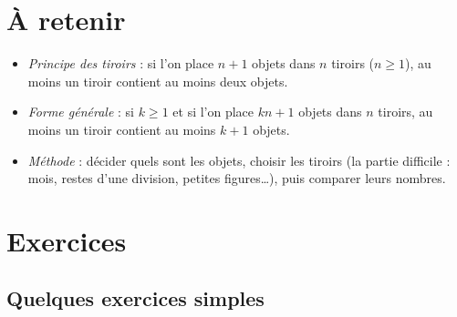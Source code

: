 \documentclass[11pt]{article}
\begin{document}
\section{À retenir}\label{sec:retenir}

\begin{retenir}
\begin{itemize}
  \item \emph{Principe des tiroirs} : si l'on place \( n+1 \) objets dans \( n \) tiroirs (\( n \geq 1 \)), au moins un tiroir contient au moins deux objets.
  \item \emph{Forme générale} : si \( k \geq 1 \) et si l'on place \( kn+1 \) objets dans \( n \) tiroirs, au moins un tiroir contient au moins \( k+1 \) objets.
  \item \emph{Méthode} : décider quels sont les objets, choisir les tiroirs (la partie difficile : mois, restes d'une division, petites figures\ldots), puis comparer leurs nombres.
\end{itemize}
\end{retenir}

\section{Exercices}\label{sec:exercices}

\subsection*{Quelques exercices simples}









\end{document}

